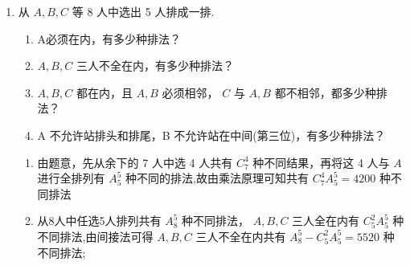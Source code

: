 \begin{enumerate}
\begin{enumerate}
\begin{jieda}
\begin{enumerate}
                \item 队员 $A$ 不能参加男子双打比赛，有两类方案:
                
                第 1 类方案是队员 $A$ 不参加任务比赛，即除了队员 $A$ 之外的 4 人参加本次比赛，只需从 4 人中选出两人，
                
                分别取参加前两场单打比赛，共有 $P_{4}^{2}$ 种，剩余人员参加双打比赛；
                
                第 2 类方案是队员 $A$ 参加单打比赛，可以分 3 个步骤完成:
                
                第 1 步, 确定队员 $A$ 参加的是哪一场单打比赛, 共 2 种;
                
                第 2 步，从剩下 4 名队员中选择一名参加另一场单打比赛，共 4 种；
                
                第 3 步,从剩下的 3 名队员中,选出两人参加男双比赛,共有 ${{C}}_{3}^{2}$ 种,
                
                根据分步乘法计数原理,队员 $A$ 参加单打比赛的不同的出场阵容有 $2 \times  4 \times  {{C}}_{3}^{2}$ 种;
                
                根据分类加法计数原理,队员 $A$ 不参加男子双打比赛的不同的出场阵容种数为 $N = P_{4}^{2} + 2 \times  4 \times  {{C}}_{3}^{2} = {36}$ .
            \end{enumerate}
        \end{jieda}
        \item 从 $A,B,C$ 等 8 人中选出 5 人排成一排.
        \begin{enumerate}
            \item A必须在内，有多少种排法？
            \item $A,B,C$ 三人不全在内，有多少种排法？
            \item $A,B,C$ 都在内，且 $A,B$ 必须相邻， $C$ 与 $A,B$ 都不相邻，都多少种排法？
            \item A 不允许站排头和排尾，B 不允许站在中间(第三位)，有多少种排法？
        \end{enumerate}
        \begin{jieda}
            \begin{enumerate}
                \item 由题意，先从余下的 7 人中选 4 人共有 ${C}_{7}^{4}$ 种不同结果，再将这 4 人与 $A$ 进行全排列有 ${A}_{5}^{5}$ 种不同的排法,故由乘法原理可知共有 ${C}_{7}^{4}{A}_{5}^{5} = {4200}$ 种不同排法

                \item 从8人中任选5人排列共有 ${A}_{8}^{5}$ 种不同排法， $A,B,C$ 三人全在内有 ${C}_{5}^{2}{A}_{5}^{5}$ 种不同排法,由间接法可得 $A,B,C$ 三人不全在内共有 ${A}_{8}^{5} - {C}_{5}^{2}{A}_{5}^{5} = {5520}$ 种不同排法;
                

\end{enumerate}
\end{jieda}
\end{enumerate}
\end{enumerate}
